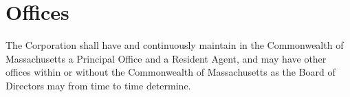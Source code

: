 \chapter{Offices}

The Corporation shall have and continuously maintain in the Commonwealth of
Massachusetts a Principal Office and a Resident Agent, and may have other
offices within or without the Commonwealth of Massachusetts as the Board of
Directors may from time to time determine.
